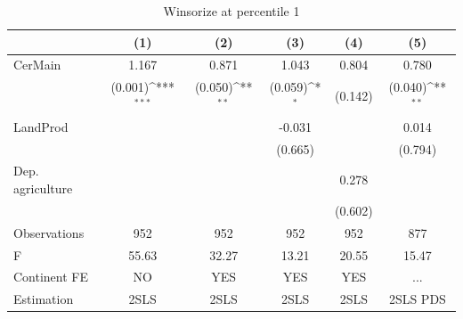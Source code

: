 \begin{table}[htbp]\centering
\def\sym#1{\ifmmode^{#1}\else\(^{#1}\)\fi}
\caption{Winsorize at percentile 1}
\begin{tabular}{l*{5}{c}}
\hline\hline
                &\multicolumn{1}{c}{(1)}         &\multicolumn{1}{c}{(2)}         &\multicolumn{1}{c}{(3)}         &\multicolumn{1}{c}{(4)}         &\multicolumn{1}{c}{(5)}         \\
\hline
CerMain         &    1.167         &    0.871         &    1.043         &    0.804         &    0.780         \\
                &  (0.001)\sym{***}&  (0.050)\sym{**} &  (0.059)\sym{*}  &  (0.142)         &  (0.040)\sym{**} \\
LandProd        &                  &                  &   -0.031         &                  &    0.014         \\
                &                  &                  &  (0.665)         &                  &  (0.794)         \\
Dep. agriculture&                  &                  &                  &    0.278         &                  \\
                &                  &                  &                  &  (0.602)         &                  \\
\hline
Observations    &      952         &      952         &      952         &      952         &      877         \\
F               &    55.63         &    32.27         &    13.21         &    20.55         &    15.47         \\
Continent FE    &       NO         &      YES         &      YES         &      YES         &      ...         \\
Estimation      &     2SLS         &     2SLS         &     2SLS         &     2SLS         & 2SLS PDS         \\
\hline\hline
\end{tabular}
\end{table}
